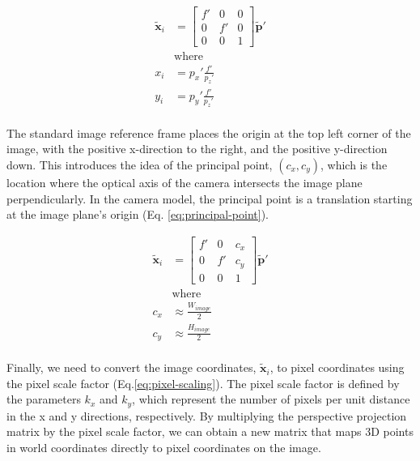 \begin{equation}
    \begin{aligned}
        \tilde{\mathbf{x}}_{i} &= \begin{bmatrix}
            f' & 0 & 0 \\ 0 & f' & 0 \\ 0 & 0 & 1 
        \end{bmatrix} \tilde{\mathbf{p}}' \\
        &\text{where} \\
        x_i &= p_x'\frac{f'}{p_z'} \\
        y_i &= p_y'\frac{f'}{p_z'} \\
    \end{aligned}
    \label{eq:perspective-projection}
\end{equation}

The standard image reference frame places the origin at the top left corner of the image, with the positive x-direction to the right, and the positive y-direction down.
This introduces the idea of the principal point, $(c_x,c_y)$, which is the location where the optical axis of the camera intersects the image plane perpendicularly.
In the camera model, the principal point is a translation starting at the image plane's origin (Eq. \ref{eq:principal-point}).


\begin{equation}
    \begin{aligned}
        \tilde{\mathbf{x}}_{i} &= \begin{bmatrix}
            f' & 0 & c_x \\ 0 & f' & c_y \\ 0 & 0 & 1 
        \end{bmatrix} \tilde{\mathbf{p}}' \\
        &\text{where} \\
        c_x &\approx \frac{W_{image}}{2} \\
        c_y &\approx \frac{H_{image}}{2} \\
    \end{aligned}
    \label{eq:principal-point}
\end{equation}

Finally, we need to convert the image coordinates, $\tilde{\mathbf{x}}_i$, to pixel coordinates using the pixel scale factor (Eq.\ref{eq:pixel-scaling}).
The pixel scale factor is defined by the parameters $k_x$ and $k_y$, which represent the number of pixels per unit distance in the x and y directions, respectively.
By multiplying the perspective projection matrix by the pixel scale factor, we can obtain a new matrix that maps 3D points in world coordinates directly to pixel coordinates on the image.

